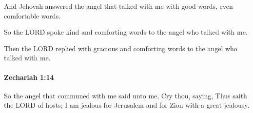 			\begin{versebox}
					\item[BHS] 
					\item[LXX] 
					\item[ASV] And Jehovah answered the angel that talked with me with good words, even comfortable words.
					\item[NIV] So the LORD spoke kind and comforting words to the angel who talked with me.
					\item[NRSV] Then the LORD replied with gracious and comforting words to the angel who talked with me.
			\end{versebox}

		\paragraph{Zechariah 1:14} %
			\label{ZECHARIAH-1-14}

			So the angel that communed with me said unto me, Cry thou, saying, Thus saith the LORD of hosts; I am jealous for Jerusalem and for Zion with a great jealousy.


